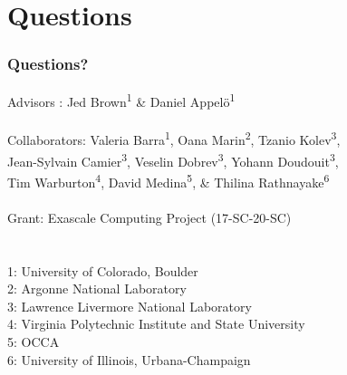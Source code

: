 \documentclass{beamer}
\begin{document}
\section{Questions}

\begin{frame}
\begin{center}
\frametitle{Questions?}

{\flushleft

Advisors : \hspace{5mm} Jed Brown\textsuperscript{1} \& Daniel Appel\"{o}\textsuperscript{1}\\

~\\

Collaborators: Valeria Barra\textsuperscript{1}, Oana Marin\textsuperscript{2}, Tzanio Kolev\textsuperscript{3},\\
\hspace{23mm} Jean-Sylvain Camier\textsuperscript{3}, Veselin Dobrev\textsuperscript{3}, Yohann Doudouit\textsuperscript{3},\\
\hspace{23mm} Tim Warburton\textsuperscript{4}, David Medina\textsuperscript{5}, \& Thilina Rathnayake\textsuperscript{6}\\

~\\

Grant: \hspace{11mm} Exascale Computing Project (17-SC-20-SC)\\

~\\

~\\

\small{1: University of Colorado, Boulder\\
2: Argonne National Laboratory\\
3: Lawrence Livermore National Laboratory\\
4: Virginia Polytechnic Institute and State University\\
5: OCCA\\
6: University of Illinois, Urbana-Champaign\\}}

\end{center}
\end{frame}


\begin{frame}
\titlepage %
\end{frame}

\end{document}
